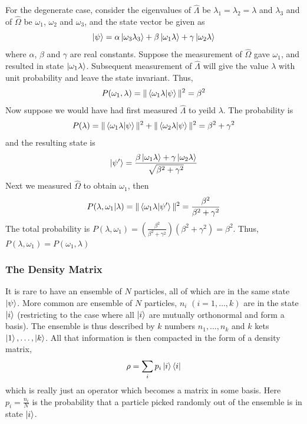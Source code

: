 \documentclass[12pt,a4paper]{report}
\begin{document}
For the degenerate case, consider the eigenvalues of $\hat{\Lambda}$ be $\lambda_1=\lambda_2=\lambda$ and $\lambda_3$ and of $\hat{\Omega}$ be $\omega_1$, $\omega_2$ and $\omega_3$,
and the state vector be given as
\begin{equation*}
    \ket{\psi} = \alpha \ket{\omega_3 \lambda_3} + \beta \ket{\omega_1 \lambda} + \gamma \ket{\omega_2 \lambda}
\end{equation*}
where $\alpha$, $\beta$ and $\gamma$ are real constants.
Suppose the measurement of $\hat{\Omega}$ gave $\omega_1$, and resulted in state $\ket{\omega_1 \lambda}$. Subsequent measurement of $\hat{\Lambda}$ will give the value $\lambda$ with
unit probability and leave the state invariant. Thus,
\begin{equation*}
    P(\omega_1, \lambda) = \| \bra{\omega_1 \lambda}\ket{\psi} \|^2 = \beta^2
\end{equation*}
Now suppose we would have had first measured $\hat{\Lambda}$ to yeild $\lambda$. The probability is
\begin{equation*}
    P(\lambda) = \|\bra{\omega_1\lambda}\ket{\psi}\|^2 + \|\bra{\omega_2\lambda}\ket{\psi}\|^2 = \beta^2+\gamma^2
\end{equation*}
and the resulting state is
\begin{equation*}
    \ket{\psi'} = \frac{\beta \ket{\omega_1 \lambda} + \gamma \ket{\omega_2 \lambda}}{\sqrt{\beta^2 + \gamma^2}}
\end{equation*}
Next we measured $\hat{\Omega}$ to obtain $\omega_1$, then
\begin{equation*}
    P(\lambda, \omega_1 | \lambda) = \|\bra{\omega_1\lambda}\ket{\psi'}\|^2 = \frac{\beta^2}{\beta^2 + \gamma^2}
\end{equation*}
The total probability is $P(\lambda, \omega_1) = \left(\frac{\beta^2}{\beta^2 + \gamma^2}\right)(\beta^2 + \gamma^2) = \beta^2$. Thus, $P(\lambda, \omega_1) = P(\omega_1, \lambda)$

\subsubsection{The Density Matrix}

It is rare to have an ensemble of $N$ particles, all of which are in the same state $\ket{\psi}$. More common are ensemble of
$N$ particles, $n_i$ $(i=1, \dots, k)$ are in the state $\ket{i}$ (restricting to the case where all $\ket{i}$ are mutually orthonormal and form a basis).
The ensemble is thus described by $k$ numbers $n_1, \dots, n_k$ and $k$ kets $\ket{1}, \dots, \ket{k}$. All that information is then compacted in the form
of a density matrix,
\begin{equation*}
    \rho = \sum_i p_i \ket{i}\bra{i}
\end{equation*}
which is really just an operator which becomes a matrix in some basis. Here $p_i = \frac{n_i}{N}$ is the probability that a particle picked randomly out of
the ensemble is in state $\ket{i}$.
\end{document}
